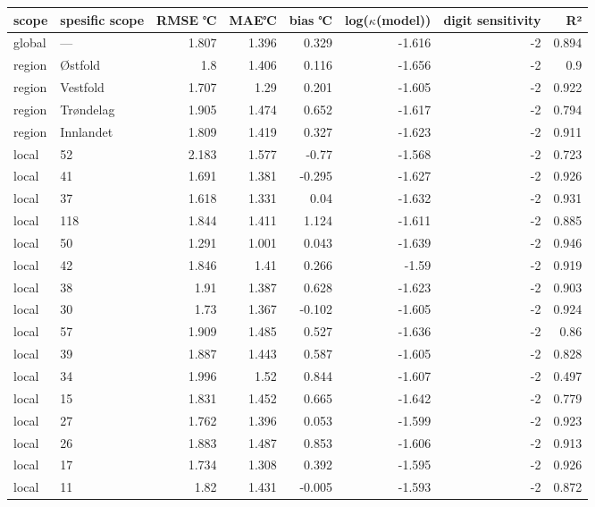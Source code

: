 \begin{tabular}{llrrrrrr}
\hline
 scope   & spesific
scope           &       RMSE
℃ &   MAE℃ &        bias
℃ &   log($\kappa$(model)) &    digit
sensitivity &    R² \\
\hline
 global  & ---       & 1.807 &  1.396 &  0.329 &                 -1.616 & -2 & 0.894 \\
 region  & Østfold   & 1.8   &  1.406 &  0.116 &                 -1.656 & -2 & 0.9   \\
 region  & Vestfold  & 1.707 &  1.29  &  0.201 &                 -1.605 & -2 & 0.922 \\
 region  & Trøndelag & 1.905 &  1.474 &  0.652 &                 -1.617 & -2 & 0.794 \\
 region  & Innlandet & 1.809 &  1.419 &  0.327 &                 -1.623 & -2 & 0.911 \\
 local   & 52        & 2.183 &  1.577 & -0.77  &                 -1.568 & -2 & 0.723 \\
 local   & 41        & 1.691 &  1.381 & -0.295 &                 -1.627 & -2 & 0.926 \\
 local   & 37        & 1.618 &  1.331 &  0.04  &                 -1.632 & -2 & 0.931 \\
 local   & 118       & 1.844 &  1.411 &  1.124 &                 -1.611 & -2 & 0.885 \\
 local   & 50        & 1.291 &  1.001 &  0.043 &                 -1.639 & -2 & 0.946 \\
 local   & 42        & 1.846 &  1.41  &  0.266 &                 -1.59  & -2 & 0.919 \\
 local   & 38        & 1.91  &  1.387 &  0.628 &                 -1.623 & -2 & 0.903 \\
 local   & 30        & 1.73  &  1.367 & -0.102 &                 -1.605 & -2 & 0.924 \\
 local   & 57        & 1.909 &  1.485 &  0.527 &                 -1.636 & -2 & 0.86  \\
 local   & 39        & 1.887 &  1.443 &  0.587 &                 -1.605 & -2 & 0.828 \\
 local   & 34        & 1.996 &  1.52  &  0.844 &                 -1.607 & -2 & 0.497 \\
 local   & 15        & 1.831 &  1.452 &  0.665 &                 -1.642 & -2 & 0.779 \\
 local   & 27        & 1.762 &  1.396 &  0.053 &                 -1.599 & -2 & 0.923 \\
 local   & 26        & 1.883 &  1.487 &  0.853 &                 -1.606 & -2 & 0.913 \\
 local   & 17        & 1.734 &  1.308 &  0.392 &                 -1.595 & -2 & 0.926 \\
 local   & 11        & 1.82  &  1.431 & -0.005 &                 -1.593 & -2 & 0.872 \\
\hline
\end{tabular}